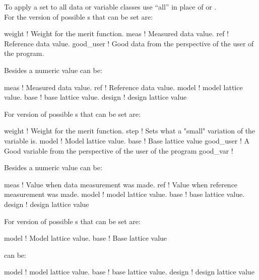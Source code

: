 \vskip 0.2in
To apply a set to all data or variable classes use ``all''
in place of  or . \\

For the  version of  possible 
s that can be set are:
\begin{example}
  weight      ! Weight for the merit function.
  meas        ! Measured data value.
  ref         ! Reference data value.
  good_user   ! Good data from the perspective of the user of the \tao program.
\end{example}
Besides a numeric value  can be:
\begin{example}
  meas        ! Measured data value.
  ref         ! Reference data value.
  model       ! model lattice value.
  base        ! base lattice value.
  design      ! design lattice value
\end{example}
\vskip 0.2in

For  version of  possible 
s that can be set are:
\begin{example}
  weight     ! Weight for the merit function.
  step       ! Sets what a "small" variation of the variable is.
  model      ! Model lattice value.
  base       ! Base lattice value
  good_user  ! A Good variable from the perspective of the user of the \tao program
  good_var   ! 
\end{example}
Besides a numeric value  can be:
\begin{example}
  meas        ! Value when data measurement was made.
  ref         ! Value when reference measurement was made.
  model       ! model lattice value.
  base        ! base lattice value.
  design      ! design lattice value
\end{example}
\vskip 0.2in

For  version of  possible 
s that can be set are:
\begin{example}
  model      ! Model lattice value.
  base       ! Base lattice value
\end{example}
 can be:
\begin{example}
  model       ! model lattice value.
  base        ! base lattice value.
  design      ! design lattice value
\end{example}
\vskip 0.2in


